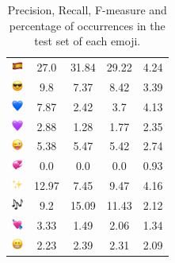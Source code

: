\documentclass{article}
\begin{document}
\begin{table}
\begin{tabular}{|c|ccc|c|}
\includegraphics[height=0.37cm,width=0.37cm]{img/Spain.png} & 27.0 & 31.84 & 29.22 & 4.24\\ 
\includegraphics[height=0.37cm,width=0.37cm]{img/smiling_face_with_sunglasses.png} & 9.8 & 7.37 & 8.42 & 3.39\\ 
\includegraphics[height=0.37cm,width=0.37cm]{img/blue_heart.png} & 7.87 & 2.42 & 3.7 & 4.13\\ 
\includegraphics[height=0.37cm,width=0.37cm]{img/purple_heart.png} & 2.88 & 1.28 & 1.77 & 2.35\\ 
\includegraphics[height=0.37cm,width=0.37cm]{img/winking_face_with_tongue.png} & 5.38 & 5.47 & 5.42 & 2.74\\ 
\includegraphics[height=0.37cm,width=0.37cm]{img/revolving_hearts.png} & 0.0 & 0.0 & 0.0 & 0.93\\ 
\includegraphics[height=0.37cm,width=0.37cm]{img/sparkles.png} & 12.97 & 7.45 & 9.47 & 4.16\\ 
\includegraphics[height=0.37cm,width=0.37cm]{img/musical_notes.png} & 9.2 & 15.09 & 11.43 & 2.12\\ 
\includegraphics[height=0.37cm,width=0.37cm]{img/heart_with_arrow.png} & 3.33 & 1.49 & 2.06 & 1.34\\ 
\includegraphics[height=0.37cm,width=0.37cm]{img/beaming_face_with_smiling_eyes.png} & 2.23 & 2.39 & 2.31 & 2.09\\ 

\hline
\end{tabular}
\caption{\label{table:emoji_detailed} Precision, Recall, F-measure and percentage of occurrences in the test set of each emoji.}
\end{table}
\end{document}

